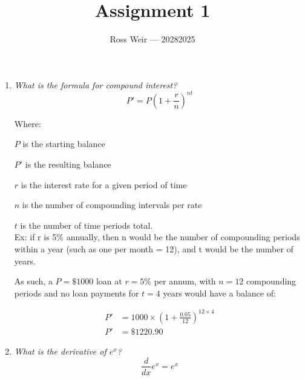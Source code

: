 \documentclass{article}
\title{Assignment 1}
\author{Ross Weir --- 20282025}
\date{}
\begin{document}
\maketitle
\begin{enumerate}
	\item{\em What is the formula for compound interest?}\\
		$$P' = P(1+\frac{r}{n})^{nt}$$

		Where:
		\par$P$ is the starting balance
		\par$P'$ is the resulting balance
		\par$r$ is the interest rate for a given period of time
		\par$n$ is the number of compounding intervals per rate
		\par$t$ is the number of time periods total.\\

		Ex: if r is 5\% annually, then n would be the number of compounding periods within a year (such as one per month = 12), and t would be the number of years.

		As such, a $P=\$1000$ loan at $r=5\%$ per annum, with $n=12$ compounding periods and no loan payments for $t=4$ years would have a balance of:
		
		\begin{align*}
		P'&= 1000\times(1+\frac{0.05}{12}) ^ {12\times4} \\
		P'&=\$1220.90
		\end{align*}

	\item{\em What is the derivative of $e^x$?}\\
		$$\frac{d}{dx} e^x = e^x$$
\end{enumerate}
\end{document}

